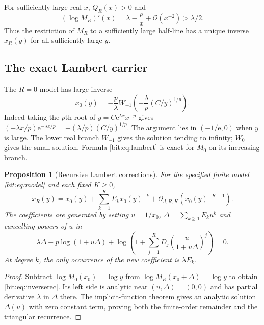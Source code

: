 \documentclass[11pt]{article}
\newtheorem{proposition}[theorem]{Proposition}
\theoremstyle{definition}\newtheorem{definition}[theorem]{Definition}
\theoremstyle{remark}\newtheorem{remark}[theorem]{Remark}
\newcommand{\bigO}{\mathcal O}
\newcommand{\ee}{\mathrm e}
\begin{document}
For sufficiently large real $x$, $Q_R(x)>0$ and
\begin{equation}
 (\log M_R)'(x)=\lambda-\frac px+\bigO(x^{-2})>\lambda/2.
 \label{bit:eq:monmodel}
\end{equation}
Thus the restriction of $M_R$ to a sufficiently large half-line has a unique inverse $x_R(y)$ for all sufficiently large $y$.

\subsection{The exact Lambert carrier}
The $R=0$ model has large inverse
\begin{equation}
 x_0(y)=-\frac p\lambda
 W_{-1}\!\left(-\frac\lambda p(C/y)^{1/p}\right).
 \label{bit:eq:lambert}
\end{equation}
Indeed taking the $p$th root of $y=C\ee^{\lambda x}x^{-p}$ gives
$(-\lambda x/p)\ee^{-\lambda x/p}=-(\lambda/p)(C/y)^{1/p}$.
The argument lies in $(-1/\ee,0)$ when $y$ is large. The lower real branch $W_{-1}$ gives the solution tending to infinity; $W_0$ gives the small solution. Formula \eqref{bit:eq:lambert} is exact for $M_0$ on its increasing branch.

\begin{proposition}[Recursive Lambert corrections]
\label{bit:prop:inverse}
For the specified finite model \eqref{bit:eq:model} and each fixed $K\ge0$,
\begin{equation}
 x_R(y)=x_0(y)+\sum_{k=1}^K E_k x_0(y)^{-k}
            +\bigO_{d,R,K}(x_0(y)^{-K-1}).
 \label{bit:eq:inverseseries}
\end{equation}
The coefficients are generated by setting $u=1/x_0$, $\Delta=\sum_{k\ge1}E_ku^k$ and cancelling powers of $u$ in
\begin{equation}
 \lambda\Delta-p\log(1+u\Delta)
 +\log\!\left(1+\sum_{j=1}^R D_j
             \left(\frac{u}{1+u\Delta}\right)^j\right)=0.
 \label{bit:eq:inverserec}
\end{equation}
At degree $k$, the only occurrence of the new coefficient is $\lambda E_k$.
\end{proposition}
\begin{proof}
Subtract $\log M_0(x_0)=\log y$ from $\log M_R(x_0+\Delta)=\log y$ to obtain \eqref{bit:eq:inverserec}. Its left side is analytic near $(u,\Delta)=(0,0)$ and has partial derivative $\lambda$ in $\Delta$ there. The implicit-function theorem gives an analytic solution $\Delta(u)$ with zero constant term, proving both the finite-order remainder and the triangular recurrence.
\end{proof}
\end{document}
